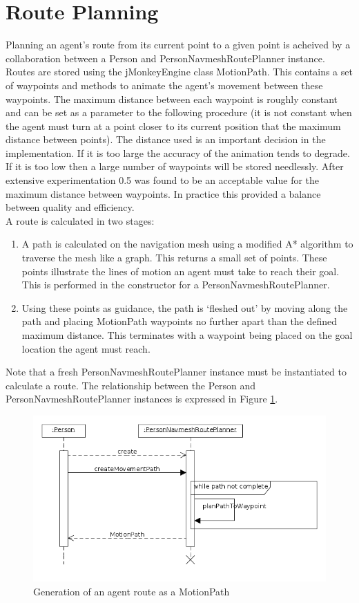 %
\section{Route Planning}
\label{Imp:sec:routePlanning}
Planning an agent's route from its current point to a given point is acheived by a collaboration between a Person and PersonNavmeshRoutePlanner instance. Routes are stored using the jMonkeyEngine class MotionPath. This contains a set of waypoints and methods to animate the agent's movement between these waypoints. The maximum distance between each waypoint is roughly constant and can be set as a parameter to the following procedure (it is not constant when the agent must turn at a point closer to its current position that the maximum distance between points). The distance used is an important decision in the implementation. If it is too large the accuracy of the animation tends to degrade. If it is too low then a large number of waypoints will be stored needlessly. After extensive experimentation 0.5 was found to be an acceptable value for the maximum distance between waypoints. In practice this provided a balance between quality and efficiency.\\
A route is calculated in two stages:
\begin{enumerate}
\item{A path is calculated on the navigation mesh using a modified A* algorithm to traverse the mesh like a graph. This returns a small set of points. These points illustrate the lines of motion an agent must take to reach their goal. This is performed in the constructor for a PersonNavmeshRoutePlanner.}
\item{Using these points as guidance, the path is `fleshed out' by moving along the path and placing MotionPath waypoints no further apart than the defined maximum
distance. This terminates with a waypoint being placed on the goal location the agent must reach.}
\end{enumerate}
Note that a fresh PersonNavmeshRoutePlanner instance must be instantiated to calculate a route. The relationship between the Person and PersonNavmeshRoutePlanner instances is expressed in Figure \ref{fig:route_plan_sequence}.

\begin{figure}
\centering
\includegraphics[scale=0.5]{../UMLDiagrams/RoutePlanningSequence.png}
\caption{Generation of an agent route as a MotionPath \label{fig:route_plan_sequence}}
\end{figure}


